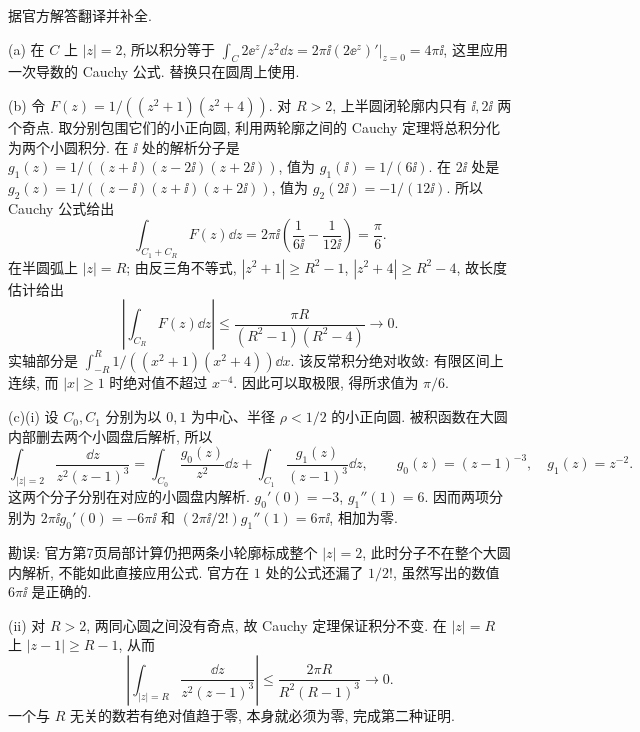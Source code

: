 \begin{solution}
据官方解答翻译并补全.

(a) 在 $C$ 上 $|z|=2$, 所以积分等于
$\int_C2\ee^z/z^2\dd z=2\pi\ii(2\ee^z)'|_{z=0}=4\pi\ii$,
这里应用一次导数的 Cauchy 公式. 替换只在圆周上使用.

(b) 令 $F(z)=1/((z^2+1)(z^2+4))$. 对 $R>2$, 上半圆闭轮廓内只有 $\ii,2\ii$ 两个奇点.
取分别包围它们的小正向圆, 利用两轮廓之间的 Cauchy 定理将总积分化为两个小圆积分.
在 $\ii$ 处的解析分子是
$g_1(z)=1/((z+\ii)(z-2\ii)(z+2\ii))$, 值为 $g_1(\ii)=1/(6\ii)$.
在 $2\ii$ 处是
$g_2(z)=1/((z-\ii)(z+\ii)(z+2\ii))$, 值为 $g_2(2\ii)=-1/(12\ii)$.
所以 Cauchy 公式给出
\[
 \int_{C_1+C_R}F(z)\dd z
 =2\pi\ii\left(\frac1{6\ii}-\frac1{12\ii}\right)=\frac\pi6.
\]
在半圆弧上 $|z|=R$; 由反三角不等式,
$|z^2+1|\ge R^2-1$, $|z^2+4|\ge R^2-4$, 故长度估计给出
\[
 \left|\int_{C_R}F(z)\dd z\right|
 \le\frac{\pi R}{(R^2-1)(R^2-4)}\longrightarrow0.
\]
实轴部分是 $\int_{-R}^R1/((x^2+1)(x^2+4))\dd x$.
该反常积分绝对收敛: 有限区间上连续, 而 $|x|\ge1$ 时绝对值不超过 $x^{-4}$.
因此可以取极限, 得所求值为 $\pi/6$.

(c)(i) 设 $C_0,C_1$ 分别为以 $0,1$ 为中心、半径 $\rho<1/2$ 的小正向圆.
被积函数在大圆内部删去两个小圆盘后解析, 所以
\[
 \int_{|z|=2}\frac{\dd z}{z^2(z-1)^3}
 =\int_{C_0}\frac{g_0(z)}{z^2}\dd z+
  \int_{C_1}\frac{g_1(z)}{(z-1)^3}\dd z,
 \qquad
 g_0(z)=(z-1)^{-3},\quad g_1(z)=z^{-2}.
\]
这两个分子分别在对应的小圆盘内解析.
$g_0'(0)=-3$, $g_1''(1)=6$. 因而两项分别为
$2\pi\ii g_0'(0)=-6\pi\ii$ 和
$(2\pi\ii/2!)g_1''(1)=6\pi\ii$, 相加为零.
\begin{center}
\end{center}
勘误: 官方第7页局部计算仍把两条小轮廓标成整个 $|z|=2$, 此时分子不在整个大圆内解析, 不能如此直接应用公式. 官方在 $1$ 处的公式还漏了 $1/2!$, 虽然写出的数值 $6\pi\ii$ 是正确的.

(ii) 对 $R>2$, 两同心圆之间没有奇点, 故 Cauchy 定理保证积分不变.
在 $|z|=R$ 上 $|z-1|\ge R-1$, 从而
\[
 \left|\int_{|z|=R}\frac{\dd z}{z^2(z-1)^3}\right|
 \le\frac{2\pi R}{R^2(R-1)^3}\longrightarrow0.
\]
一个与 $R$ 无关的数若有绝对值趋于零, 本身就必须为零, 完成第二种证明.
\end{solution}

